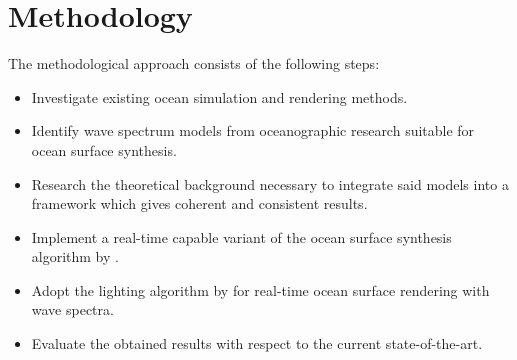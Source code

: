 \documentclass[a4paper,11pt,twoside]{memoir}
\begin{document}
\section{Methodology}
The methodological approach consists of the following steps:
\begin{itemize}
\item Investigate existing ocean simulation and rendering methods.
\item Identify wave spectrum models from oceanographic research suitable for
ocean surface synthesis.
\item Research the theoretical background necessary to integrate said models
into a framework which gives coherent and consistent results.
\item Implement a real-time capable variant of the ocean surface synthesis algorithm by \citet{course:simulatingocean}.
\item Adopt the lighting algorithm by \citet{article:oceanlighting} for real-time ocean surface rendering with wave spectra.
\item Evaluate the obtained results with respect to the current state-of-the-art.
\end{itemize}
\end{document}
